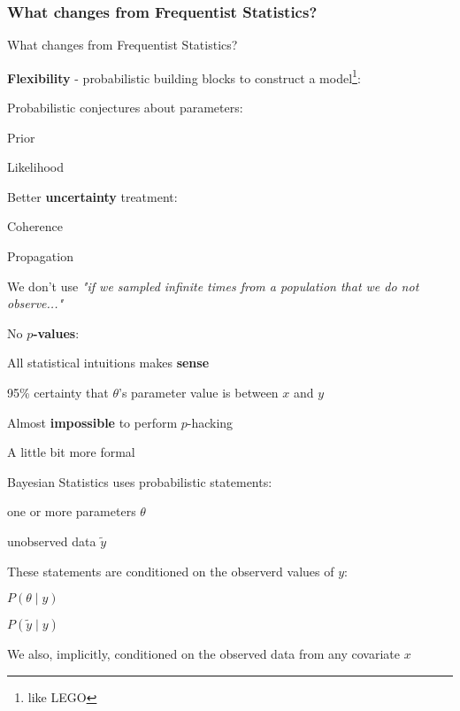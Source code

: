 \subsubsection{What changes from Frequentist Statistics?}
\begin{frame}{What changes from Frequentist Statistics?}
	\begin{vfilleditems}
		\item \textbf{Flexibility} - probabilistic building blocks to
		construct a model\footnote{like LEGO}:
		\begin{vfilleditems}
			\item Probabilistic conjectures about parameters:
			\begin{vfilleditems}
				\item Prior
				\item Likelihood
			\end{vfilleditems}
		\end{vfilleditems}
		\item Better \textbf{uncertainty} treatment:
		\begin{vfilleditems}
			\item Coherence
			\item Propagation
			\item We don't use \textit{"if we sampled infinite times
				from a population that we do not observe..."}
		\end{vfilleditems}
		\item No \textbf{$p$-values}:
		\begin{vfilleditems}
			\item All statistical intuitions makes \textbf{sense}
			\item 95\% certainty that $\theta$'s parameter value is
			between $x$ and $y$
			\item Almost \textbf{impossible} to perform $p$-hacking
		\end{vfilleditems}
	\end{vfilleditems}
\end{frame}

\begin{frame}{A little bit more formal}
	\begin{vfilleditems}
		\item Bayesian Statistics uses probabilistic statements:
		\begin{vfilleditems}
			\item one or more parameters $\theta$
			\item unobserved data $\tilde{y}$
		\end{vfilleditems}
		\item These statements are conditioned on the observerd values of $y$:
		\begin{vfilleditems}
			\item $P(\theta \mid y)$
			\item $P(\tilde{y} \mid y)$
		\end{vfilleditems}
		\item We also, implicitly, conditioned on the observed data from
		any covariate $x$
	\end{vfilleditems}
\end{frame}

